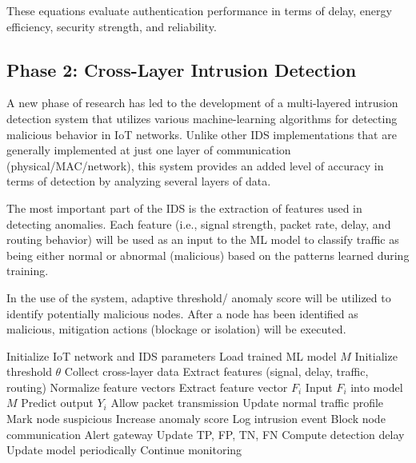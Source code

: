 \documentclass[a4paper,fleqn]{cas-dc}
\numberwithin{equation}{section}
\begin{document}
These equations evaluate authentication performance in terms of delay, energy efficiency, security strength, and reliability.

\subsection{Phase 2: Cross-Layer Intrusion Detection}

A new phase of research has led to the development of a multi-layered intrusion detection system that utilizes various machine-learning algorithms for detecting malicious behavior in IoT networks. Unlike other IDS implementations that are generally implemented at just one layer of communication (physical/MAC/network), this system provides an added level of accuracy in terms of detection by analyzing several layers of data.

The most important part of the IDS is the extraction of features used in detecting anomalies. Each feature (i.e., signal strength, packet rate, delay, and routing behavior) will be used as an input to the ML model to classify traffic as being either normal or abnormal (malicious) based on the patterns learned during training.

In the use of the system, adaptive threshold/ anomaly score will be utilized to identify potentially malicious nodes. After a node has been identified as malicious, mitigation actions (blockage or isolation) will be executed.

\begin{algorithm}
\caption{Cross-Layer Intrusion Detection Algorithm}
\begin{algorithmic}[1]
\STATE Initialize IoT network and IDS parameters
\STATE Load trained ML model $M$
\STATE Initialize threshold $\theta$
\STATE Collect cross-layer data
\STATE Extract features (signal, delay, traffic, routing)
\STATE Normalize feature vectors
    \STATE Extract feature vector $F_i$
    \STATE Input $F_i$ into model $M$
    \STATE Predict output $Y_i$
        \STATE Allow packet transmission
        \STATE Update normal traffic profile
    \ELSE
        \STATE Mark node suspicious
        \STATE Increase anomaly score
        \STATE Log intrusion event
            \STATE Block node communication
            \STATE Alert gateway
        \ENDIF
    \ENDIF
    \STATE Update TP, FP, TN, FN
    \STATE Compute detection delay
\ENDFOR
\STATE Update model periodically
\STATE Continue monitoring
\end{algorithmic}
\end{algorithm}
\end{document}

